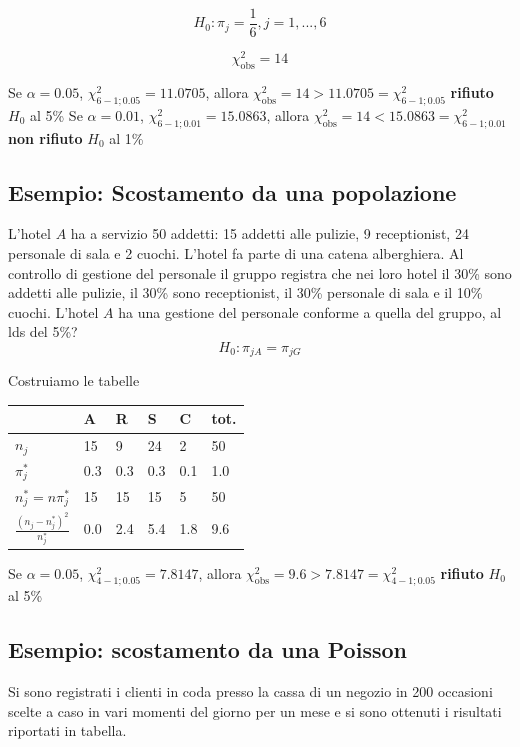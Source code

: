 \documentclass[
  11pt,
]{book}
\theoremstyle{mytheoremstyle}
\theoremstyle{mydefstyle}
\begin{document}
\[H_0:\pi_j=\frac 1 6, j=1,...,6\]

\[\chi_\text{obs}^2=14\]

Se \(\alpha=0.05\), \(\chi_{6-1;0.05}^2=11.0705\),
allora \(\chi^2_\text{obs}=14>11.0705=\chi_{6-1;0.05}^2\) \textbf{rifiuto} \(H_0\) al 5\%
Se \(\alpha=0.01\), \(\chi_{6-1;0.01}^2=15.0863\),
allora \(\chi^2_\text{obs}=14<15.0863=\chi_{6-1;0.01}^2\) \textbf{non rifiuto} \(H_0\) al 1\%

\subsection{Esempio: Scostamento da una popolazione}\label{esempio-scostamento-da-una-popolazione}

L'hotel \(A\) ha a servizio 50 addetti: 15 addetti alle pulizie, 9 receptionist, 24 personale di sala e 2 cuochi. L'hotel fa parte di
una catena alberghiera. Al controllo di gestione del personale il gruppo registra che nei loro hotel il 30\% sono addetti alle pulizie,
il 30\% sono receptionist, il 30\% personale di sala e il 10\% cuochi.
L'hotel \(A\) ha una gestione del personale conforme a quella del gruppo, al lds del 5\%?
\[H_0:\pi_{jA}=\pi_{jG}\]

Costruiamo le tabelle

\begin{tabular}{llllll}
\toprule
  & A & R & S & C & tot.\\
\midrule
$n_j$ & 15 & 9 & 24 & 2 & 50\\
$\pi_j^*$ & 0.3 & 0.3 & 0.3 & 0.1 & 1.0\\
$n_j^*=n\pi_j^*$ & 15 & 15 & 15 & 5 & 50\\
$\frac {(n_j-n_j^*)^2}{n_j^*}$ & 0.0 & 2.4 & 5.4 & 1.8 & 9.6\\
\bottomrule
\end{tabular}

Se \(\alpha=0.05\), \(\chi_{4-1;0.05}^2=7.8147\), allora \(\chi^2_\text{obs}=9.6>7.8147=\chi_{4-1;0.05}^2\) \textbf{rifiuto} \(H_0\) al 5\%

\subsection{Esempio: scostamento da una Poisson}\label{esempio-scostamento-da-una-poisson}

Si sono registrati i clienti in coda presso la cassa di un negozio in 200 occasioni
scelte a caso in vari momenti del giorno per un mese e si sono ottenuti i risultati riportati
in tabella.
\end{document}
